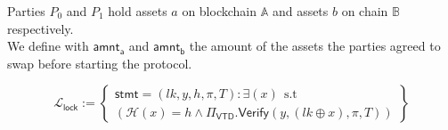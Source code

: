 \documentclass{article}      	%
\begin{document}
Parties $P_0$ and $P_1$ hold assets $a$ on blockchain $\mathbb{A}$ and assets $b$ on chain $\mathbb{B}$ respectively. \\
We define with $\mathsf{amnt_a}$ and $\mathsf{amnt_b}$ the amount of the assets the parties agreed to swap before starting the protocol.

\[
    \mathcal{L}_{\mathsf{lock}} := \left\{\begin{array}{lr}  \mathsf{stmt} = (lk, y, h, \pi, T) : \exists (x) \:\: \text{s.t} \\
    (\mathcal{H}(x) = h \land \Pi_\mathsf{VTD}.\mathsf{Verify}(y, (lk \oplus x), \pi, T)) \end{array}\right\}
\]
\end{document}
